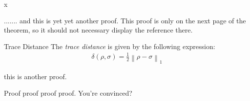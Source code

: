 \documentclass[12pt,a5paper]{article}
\begin{document}
\cleardoublepage
x
\begin{myproof}[*thm:1]
  ....... and this is yet yet another proof.  This proof is only on the next page of the
  theorem, so it should not necessary display the reference there.
\end{myproof}

\begin{thmheading}{Trace Distance}
  \label{thmheading:trace-dist}
  The \emph{trace distance} is given by the following expression:
  \begin{align}
    \delta(\rho,\sigma) = \frac12 \left\lVert \rho - \sigma \right\rVert_1
  \end{align}
\end{thmheading}

\cleardoublepage

\begin{myproof}[*lem:1]
  this is another proof.
\end{myproof}

\cleardoublepage

\begin{myproof}
  Proof proof proof proof. You're convinced?
\end{myproof}
\end{document}
